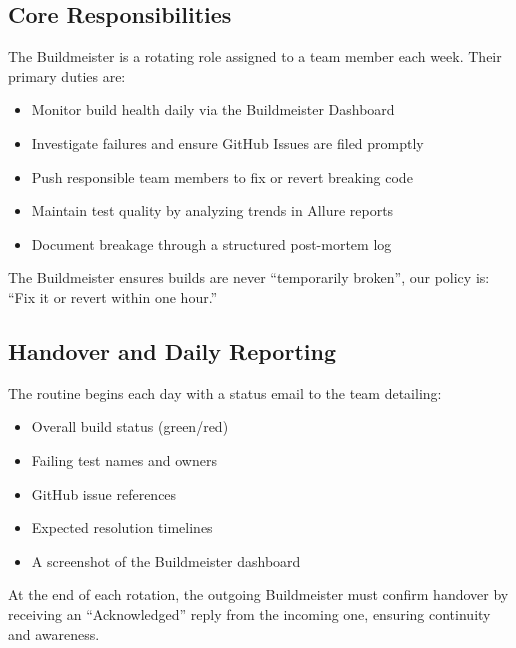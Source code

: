 \documentclass{article}
\begin{document}
\subsection{Core Responsibilities}

The Buildmeister is a rotating role assigned to a team member each week. Their primary
duties are:

\begin{itemize}

  \item Monitor build health daily via the Buildmeister Dashboard

  \item Investigate failures and ensure GitHub Issues are filed promptly

  \item Push responsible team members to fix or revert breaking code

  \item Maintain test quality by analyzing trends in Allure reports

  \item Document breakage through a structured post-mortem log
\end{itemize}

The Buildmeister ensures builds are never ``temporarily broken'', our policy is:
``Fix it or revert within one hour.''

\subsection{Handover and Daily Reporting}

The routine begins each day with a status email to the team detailing:

\begin{itemize}

  \item Overall build status (green/red)

  \item Failing test names and owners

  \item GitHub issue references

  \item Expected resolution timelines

  \item A screenshot of the Buildmeister dashboard
\end{itemize}

At the end of each rotation, the outgoing Buildmeister must confirm handover by receiving
an ``Acknowledged'' reply from the incoming one, ensuring continuity and
awareness.
\end{document}

